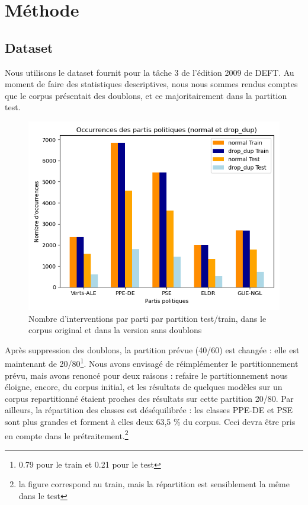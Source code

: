 \section{Méthode}

\subsection{Dataset}

Nous utilisons le dataset fournit pour la tâche 3 de l’édition 2009 de DEFT.
Au moment de faire des statistiques descriptives, nous nous sommes rendus comptes 
que le corpus présentait des doublons, et ce majoritairement dans la partition test.
\begin{figure}[ht]
    \centering
    \includegraphics[width=\columnwidth]{../stats/occurences_orig_vs_drop_dup_par_cat.png}
    \caption{Nombre d'interventions par parti par partition test/train, dans le corpus original et dans la version sans doublons}
    \label{fig:barplot_dataset}
\end{figure}

Après suppression des doublons, la partition prévue (40/60) est changée : elle est 
maintenant de 20/80\footnote{ 0.79 pour le train et 0.21 pour le test}.
Nous avons envisagé de réimplémenter le partitionnement prévu, mais avons renoncé pour deux raisons : 
refaire le partitionnement nous éloigne, encore, du corpus initial, et les 
résultats de quelques modèles sur un corpus repartitionné étaient proches des résultats 
sur cette partition 20/80.
Par ailleurs, la répartition des classes est déséquilibrée : les classes PPE-DE et PSE sont plus grandes et forment à elles deux 63,5 \% du corpus. Ceci devra être 
pris en compte dans le prétraitement.\footnote{la figure correspond au train, mais la répartition est sensiblement la même dans le test}

